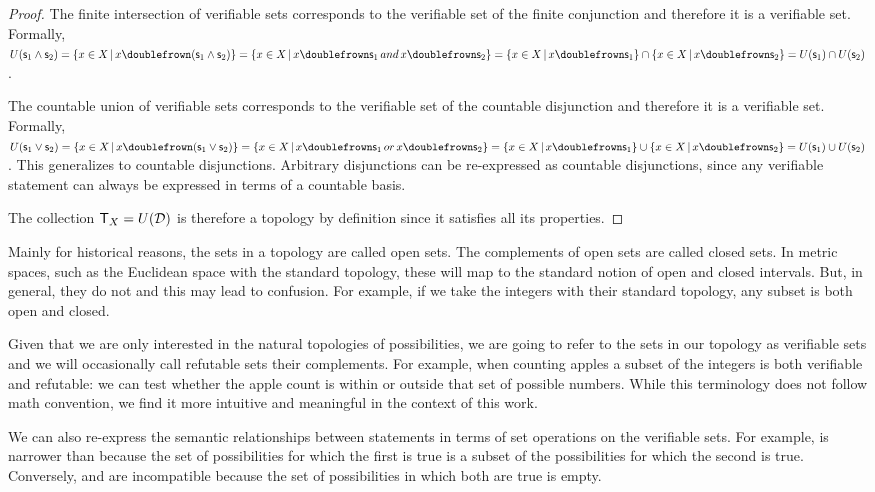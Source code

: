 \documentclass[11pt,letterpaper,fleqn]{memoir} %
\begin{document}
\begin{mathSection}
\begin{proof}
	The finite intersection of verifiable sets corresponds to the verifiable set of the finite conjunction and therefore it is a verifiable set. Formally, $U(\obs_1\AND\obs_2) = \{ x \in X \, | \, x \comp (\obs_1\AND\obs_2)\} =  \{ x \in X \, | \, x \comp \obs_1 \, and \, x \comp \obs_2\} = \{ x \in X \, | \, x \comp \obs_1\} \cap \{ x \in X \, | \, x \comp \obs_2\} = U(\obs_1) \cap U(\obs_2)$.

	The countable union of verifiable sets corresponds to the verifiable set of the countable disjunction and therefore it is a verifiable set. Formally, $U(\obs_1\OR\obs_2) = \{ x \in X \, | \, x \comp (\obs_1\OR\obs_2)\} =  \{ x \in X \, | \, x \comp \obs_1 \, or \, x \comp \obs_2\} = \{ x \in X \, | \, x \comp \obs_1\} \cup \{ x \in X \, | \, x \comp \obs_2\} = U(\obs_1) \cup U(\obs_2)$. This generalizes to countable disjunctions. Arbitrary disjunctions can be re-expressed as countable disjunctions, since any verifiable statement can always be expressed in terms of a countable basis.

	The collection $\mathsf{T}_X=U(\mathcal{D})$ is therefore a topology by definition since it satisfies all its properties.
\end{proof}
\end{mathSection}

Mainly for historical reasons, the sets in a topology are called open sets. The complements of open sets are called closed sets. In metric spaces, such as the Euclidean space with the standard topology, these will map to the standard notion of open and closed intervals. But, in general, they do not and this may lead to confusion. For example, if we take the integers with their standard topology, any subset is both open and closed.

Given that we are only interested in the natural topologies of possibilities, we are going to refer to the sets in our topology as verifiable sets and we will occasionally call refutable sets their complements. For example, when counting apples a subset of the integers is both verifiable and refutable: we can test whether the apple count is within or outside that set of possible numbers. While this terminology does not follow math convention, we find it more intuitive and meaningful in the context of this work.

We can also re-express the semantic relationships between statements in terms of set operations on the verifiable sets. For example,  is narrower than  because the set of possibilities for which the first is true is a subset of the possibilities for which the second is true. Conversely,  and  are incompatible because the set of possibilities in which both are true is empty.
\end{document}
